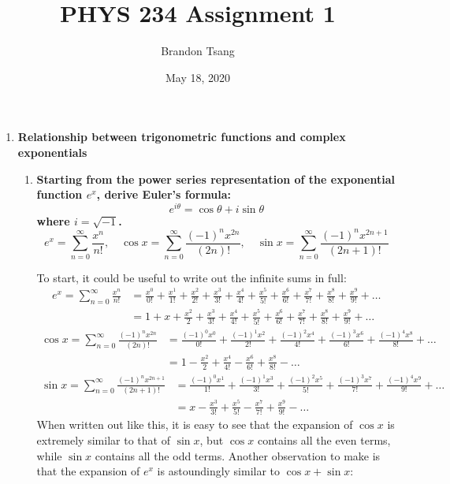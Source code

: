 \documentclass[11pt]{article}
\title{PHYS 234 Assignment 1}
\author{Brandon Tsang}
\date{May 18, 2020}
\begin{document}
    \maketitle
    \begin{enumerate}[label=\textbf{\arabic*.}]
        \item{
            \textbf{Relationship between trigonometric functions and complex exponentials}
            \begin{enumerate}[label=\textbf{(\alph*)}]
                \item{
                    \textbf{\boldmath Starting from the power series representation of the exponential function \(e^x\), derive Euler's formula: \[e^{i\theta}=\cos\theta+i\sin\theta\] where \(i=\sqrt{-1}\). \[e^x=\sum_{n=0}^\infty\frac{x^n}{n!},\quad\cos x=\sum_{n=0}^\infty\frac{(-1)^nx^{2n}}{(2n)!},\quad\sin x=\sum_{n=0}^\infty\frac{(-1)^nx^{2n+1}}{(2n+1)!}\]}
                }
                \par
                To start, it could be useful to write out the infinite sums in full:
                \begin{align*}
                    e^x=\sum_{n=0}^\infty\frac{x^n}{n!}&=\frac{x^0}{0!}+\frac{x^1}{1!}+\frac{x^2}{2!}+\frac{x^3}{3!}+\frac{x^4}{4!}+\frac{x^5}{5!}+\frac{x^6}{6!}+\frac{x^7}{7!}+\frac{x^8}{8!}+\frac{x^9}{9!}+\ldots \\
                    &=1+x+\frac{x^2}{2}+\frac{x^3}{3!}+\frac{x^4}{4!}+\frac{x^5}{5!}+\frac{x^6}{6!}+\frac{x^7}{7!}+\frac{x^8}{8!}+\frac{x^9}{9!}+\ldots
                \end{align*}
                \begin{align*}
                    \cos x=\sum_{n=0}^\infty\frac{(-1)^nx^{2n}}{(2n)!}&=\frac{(-1)^0x^0}{0!}+\frac{(-1)^1x^2}{2!}+\frac{(-1)^2x^4}{4!}+\frac{(-1)^3x^6}{6!}+\frac{(-1)^4x^8}{8!}+\ldots \\
                    &=1-\frac{x^2}{2}+\frac{x^4}{4!}-\frac{x^6}{6!}+\frac{x^8}{8!}-\ldots
                \end{align*}
                \begin{align*}
                    \sin x=\sum_{n=0}^\infty\frac{(-1)^nx^{2n+1}}{(2n+1)!}&=\frac{(-1)^0x^1}{1!}+\frac{(-1)^1x^3}{3!}+\frac{(-1)^2x^5}{5!}+\frac{(-1)^3x^7}{7!}+\frac{(-1)^4x^9}{9!}+\ldots \\
                    &=x-\frac{x^3}{3!}+\frac{x^5}{5!}-\frac{x^7}{7!}+\frac{x^9}{9!}-\ldots
                \end{align*}
                When written out like this, it is easy to see that the expansion of \(\cos x\) is extremely similar to that of \(\sin x\), but \(\cos x\) contains all the even terms, while \(\sin x\) contains all the odd terms. Another observation to make is that the expansion of \(e^x\) is astoundingly similar to \(\cos x+\sin x\):

\end{enumerate}}
\end{enumerate}
\end{document}
